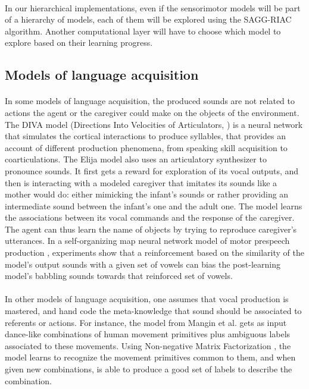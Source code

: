 \documentclass[12pt]{article}
\begin{document}
		\paragraph{}
		In our hierarchical implementations, even if the sensorimotor models will be part of a hierarchy of models, 
		each of them will be explored using the SAGG-RIAC algorithm. 
		Another computational layer will have to choose which model to explore based on their learning progress.

	
	\subsection{Models of language acquisition}
	
		\paragraph{}
		In some models of language acquisition, the produced sounds are not related to actions the agent or the caregiver 
		could make on the objects of the environment.
		The DIVA model (Directions Into Velocities of Articulators, \cite{guenther2006neural}) 
		is a neural network that simulates the cortical interactions to produce
		syllables, that provides an account of different production phenomena, from speaking skill acquisition to coarticulations.	
		The Elija model \cite{howard2011modeling} also uses an articulatory synthesizer to pronounce sounds. 
		It first gets a reward for exploration of its vocal outputs, and then 
		is interacting with a modeled caregiver that imitates its sounds like a mother would do: 
		either mimicking the infant's sounds or rather providing an intermediate 
		sound between the infant's one and the adult one. 
		The model learns the associations between its vocal commands and the response of the caregiver.
		The agent can thus learn the name of objects by trying to reproduce caregiver's utterances.		
		In a self-organizing map neural network model of motor prespeech production \cite{warlaumont2013prespeech}, experiments
		show that a reinforcement based on the similarity of the model's output sounds 
		with a given set of vowels can bias the post-learning model's babbling sounds
		towards that reinforced set of vowels.
		
		\paragraph{}
		In other models of language acquisition, one assumes that vocal production is mastered, and
		hand code the meta-knowledge that sound should be associated to referents or actions.
		For instance, the model from Mangin et al. \cite{mangin2012learning} gets as input dance-like combinations of human movement primitives plus ambiguous 
		labels associated to these movements.
		Using Non-negative Matrix Factorization \cite{paatero1994positive}, the model learns to recognize the movement primitives common to them, 
		and when given new combinations, is able to produce a good set of 
		labels to describe the combination.
\end{document}

